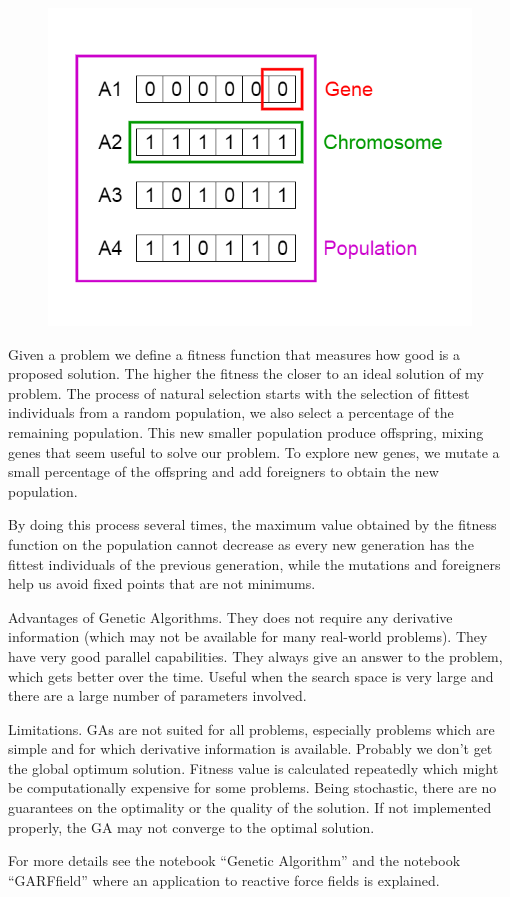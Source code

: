 \documentclass[11pt,letterpaper]{report}
\begin{document}
\begin{figure}[h!]
	\centering
	\includegraphics[width=0.45\linewidth]{figures/GAfigure1.png}
	\caption{}
	\label{fig:GA}
\end{figure} 	


Given a problem we define a fitness function that measures how good is a proposed solution. The higher the fitness the closer to an ideal solution of my problem.
The process of natural selection starts with the selection of fittest individuals from a random population, we also select a percentage of the remaining population. This new smaller population produce offspring, mixing genes that seem useful to solve our problem. To explore new genes, we mutate a small percentage of the offspring and add foreigners to obtain the new population.

By doing this process several times, the maximum value obtained by the fitness function on the population cannot  decrease as every new generation has the fittest individuals of the previous generation, while the mutations and foreigners help us avoid fixed points that are not minimums. 

Advantages of Genetic Algorithms. They does not require any derivative information (which may not be available for many real-world problems). They have very good parallel capabilities. They always give an answer to the problem, which gets better over the time.
Useful when the search space is very large and there are a large number of parameters involved.

Limitations. GAs are not suited for all problems, especially problems which are simple and for which derivative information is available. Probably we don't get the global optimum solution. Fitness value is calculated repeatedly which might be computationally expensive for some problems.
Being stochastic, there are no guarantees on the optimality or the quality of the solution.
If not implemented properly, the GA may not converge to the optimal solution.
		
For more details see the notebook ``Genetic Algorithm'' and the notebook ``GARFfield'' where an application to reactive force fields is explained.
 
\end{document}
